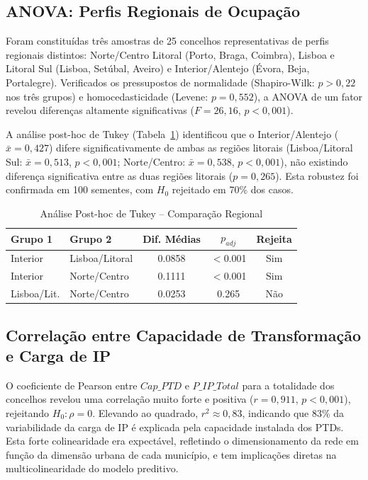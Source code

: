 \documentclass[conference]{IEEEtran}
\begin{document}
\subsection{ANOVA: Perfis Regionais de Ocupação}

Foram constituídas três amostras de 25 concelhos representativas de perfis regionais distintos: Norte/Centro Litoral (Porto, Braga, Coimbra), Lisboa e Litoral Sul (Lisboa, Setúbal, Aveiro) e Interior/Alentejo (Évora, Beja, Portalegre). Verificados os pressupostos de normalidade (Shapiro-Wilk: $p > 0{,}22$ nos três grupos) e homocedasticidade (Levene: $p = 0{,}552$), a ANOVA de um fator \cite{b2} revelou diferenças altamente significativas ($F = 26{,}16$, $p < 0{,}001$).

A análise post-hoc de Tukey \cite{b9} (Tabela~\ref{tab:tukey}) identificou que o Interior/Alentejo ($\bar{x} = 0{,}427$) difere significativamente de ambas as regiões litorais (Lisboa/Litoral Sul: $\bar{x} = 0{,}513$, $p < 0{,}001$; Norte/Centro: $\bar{x} = 0{,}538$, $p < 0{,}001$), não existindo diferença significativa entre as duas regiões litorais ($p = 0{,}265$). Esta robustez foi confirmada em 100 sementes, com $H_0$ rejeitado em 70\% dos casos.

\begin{table}[htbp]
\caption{Análise Post-hoc de Tukey -- Comparação Regional}
\begin{center}
\begin{tabular}{llccc}
\toprule
\textbf{Grupo 1} & \textbf{Grupo 2} & \textbf{Dif. Médias} & $p_{adj}$ & \textbf{Rejeita} \\
\midrule
Interior     & Lisboa/Litoral & 0.0858 & $<$0.001 & Sim \\
Interior     & Norte/Centro   & 0.1111 & $<$0.001 & Sim \\
Lisboa/Lit.  & Norte/Centro   & 0.0253 & 0.265    & Não \\
\bottomrule
\end{tabular}
\label{tab:tukey}
\end{center}
\end{table}

\subsection{Correlação entre Capacidade de Transformação e Carga de IP}

O coeficiente de Pearson \cite{b7} entre $Cap\_PTD$ e $P\_IP\_Total$ para a totalidade dos concelhos revelou uma correlação muito forte e positiva ($r = 0{,}911$, $p < 0{,}001$), rejeitando $H_0: \rho = 0$. Elevando ao quadrado, $r^2 \approx 0{,}83$, indicando que 83\% da variabilidade da carga de IP é explicada pela capacidade instalada dos PTDs. Esta forte colinearidade era expectável, refletindo o dimensionamento da rede em função da dimensão urbana de cada município, e tem implicações diretas na multicolinearidade do modelo preditivo.
\end{document}
